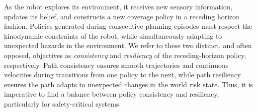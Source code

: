 \documentclass[letterpaper]{article} %
\begin{document}
\noindent
% 
As the robot explores its environment, it receives new sensory information, updates its belief, and constructs a new coverage policy in a receding horizon fashion.
Policies generated during consecutive planning episodes must respect the kinodynamic constraints of the robot, while simultaneously adapting to unexpected hazards in the environment.
We refer to these two distinct, and often opposed, objectives as \textit{consistency} and \textit{resiliency} of the receding-horizon policy, respectively.
Path consistency ensures smooth trajectories and continuous velocities during transitions from one policy to the next, while path resiliency ensures the path adapts to unexpected changes in the world risk state. %
Thus, it is imperative to find a balance between policy consistency and resiliency, particularly for safety-critical systems.
\end{document}
